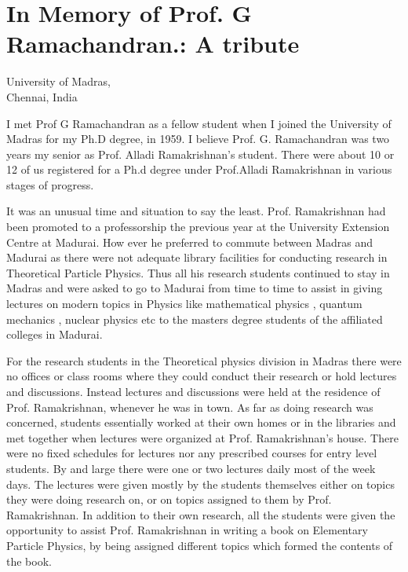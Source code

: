 \chapter[In Memory of Prof. G Ramachandran.: A tribute]{In Memory of Prof. G Ramachandran.: A tribute}\label{chap10}


\begin{center}
University of Madras,\\
Chennai, India
\end{center}

I met Prof G Ramachandran as a fellow student when I joined the University of Madras for my Ph.D degree, in 1959. I believe Prof. G. Ramachandran was two years my senior as Prof. Alladi Ramakrishnan’s student.  There were about 10 or 12 of us registered for a Ph.d degree under Prof.Alladi Ramakrishnan in various stages of progress. 

It was an unusual time and situation  to say the least. Prof. Ramakrishnan had been promoted to a professorship the previous year at the University Extension Centre at Madurai. How ever he preferred to commute between Madras and Madurai as there were not adequate library facilities for conducting research in Theoretical Particle Physics. Thus all his research students continued to stay in Madras and were asked to go to Madurai from time to time to assist in giving lectures on modern topics in Physics like mathematical physics , quantum mechanics , nuclear physics etc to the masters degree students of the affiliated colleges in Madurai.

For the research students in the Theoretical physics division in Madras there were no offices or class rooms where they could conduct their research or hold lectures and discussions. Instead lectures and discussions were held at the residence of Prof. Ramakrishnan, whenever he was in town. As far as doing research was concerned, students essentially worked at their own homes or in the libraries and met together when lectures were organized at Prof. Ramakrishnan’s house. There were no fixed schedules for lectures nor any prescribed courses for entry level students. By and large there were one or two lectures daily  most of the week days. The lectures were  given mostly by the students themselves either on topics they were doing research on, or on topics assigned to them by Prof. Ramakrishnan. In addition to their own  research, all the students were given the opportunity to assist Prof. Ramakrishnan in writing a book on Elementary Particle Physics, by being assigned different topics which formed the contents of the book.

